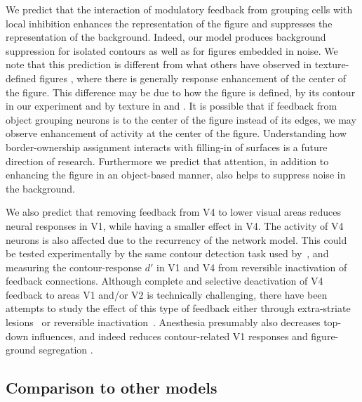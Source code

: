 We predict that the interaction of modulatory feedback from grouping
cells with local inhibition enhances the representation of the figure
and suppresses the representation of the background.  Indeed, our
model produces background suppression for isolated contours as well as
for figures embedded in noise.  We note that this prediction is
different from what others have observed in texture-defined figures
\citep{Lamme95,Lee_etal98a}, where there is generally response
enhancement of the center of the figure.  This difference may be due
to how the figure is defined, by its contour in our experiment and by
texture in \cite{Lamme95} and \cite{Lee_etal98a}. It is possible that if feedback from object grouping neurons is to the center of the
figure instead of its edges, we may observe enhancement of activity at
the center of the figure. Understanding how border-ownership assignment interacts with filling-in of surfaces is a future direction of research.  Furthermore we predict that attention, in addition to
enhancing the figure in an object-based manner, also helps to suppress
noise in the background.

We also predict that removing feedback from V4 to lower visual areas
reduces neural responses in V1, while having a smaller effect in V4.
The activity of V4 neurons is also affected due to the recurrency of
the network model. This could be tested experimentally by the same contour detection task used by~\cite{Chen_etal14}, and measuring the
contour-response $d'$ in V1 and V4 from reversible inactivation of
feedback connections. Although complete and selective deactivation of
V4 feedback to areas V1 and/or V2 is technically challenging, there
have been attempts to study the effect of this type of feedback either
through extra-striate lesions~\citep{Super_Lamme07} or reversible
inactivation~\citep{Jansen-Amorim_etal12}.  Anesthesia presumably also
decreases top-down influences, and indeed reduces contour-related V1
responses \citep{Li_etal08a} and figure-ground segregation
\citep{Lamme_etal98}.

\subsection{Comparison to other models}

